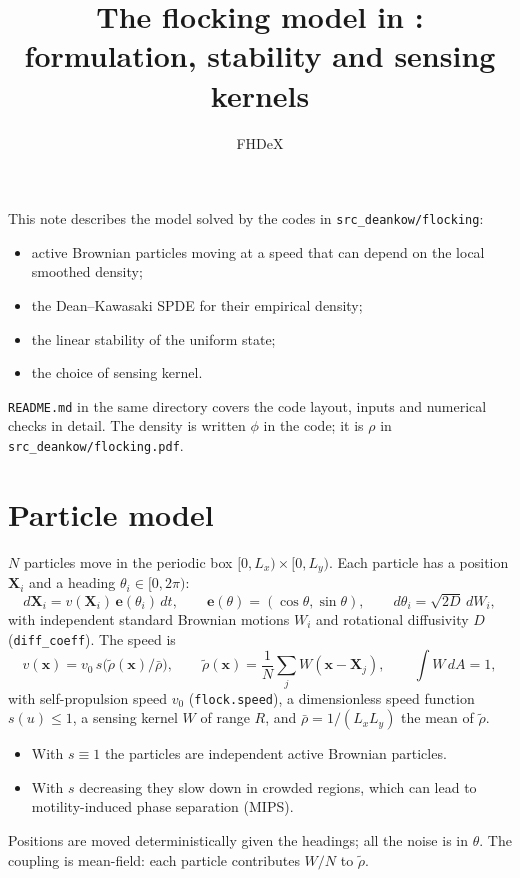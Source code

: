 \documentclass[11pt]{article}
\title{The flocking model in \code{src\_deankow/flocking}:\\
formulation, stability and sensing kernels}
\author{FHDeX}
\date{}
\newcommand{\code}[1]{\texttt{#1}}
\newcommand{\e}{\mathbf{e}}
\newcommand{\rt}{\tilde\rho}
\newcommand{\rb}{\bar\rho}
\begin{document}
\maketitle

\noindent This note describes the model solved by the codes in
\code{src\_deankow/flocking}:
\begin{itemize}[nosep]
  \item active Brownian particles moving at a speed that can depend on the
        local smoothed density;
  \item the Dean--Kawasaki SPDE for their empirical density;
  \item the linear stability of the uniform state;
  \item the choice of sensing kernel.
\end{itemize}
\code{README.md} in the same directory covers the code layout, inputs and
numerical checks in detail. The density is written $\phi$ in the code; it is
$\rho$ in \code{src\_deankow/flocking.pdf}.

\section{Particle model}

$N$ particles move in the periodic box $[0,L_x)\times[0,L_y)$. Each particle
has a position $\mathbf{X}_i$ and a heading $\theta_i\in[0,2\pi)$:
\begin{equation}
  d\mathbf{X}_i = v(\mathbf{X}_i)\,\e(\theta_i)\,dt, \qquad
  \e(\theta) = (\cos\theta, \sin\theta), \qquad
  d\theta_i = \sqrt{2D}\,dW_i ,
\end{equation}
with independent standard Brownian motions $W_i$ and rotational diffusivity
$D$ (\code{diff\_coeff}). The speed is
\begin{equation}
  v(\mathbf{x}) = v_0\, s\bigl(\rt(\mathbf{x})/\rb\bigr), \qquad
  \rt(\mathbf{x}) = \frac{1}{N}\sum_j W(\mathbf{x}-\mathbf{X}_j), \qquad
  \int W\,dA = 1 ,
\end{equation}
with self-propulsion speed $v_0$ (\code{flock.speed}), a dimensionless speed
function $s(u)\le 1$, a sensing kernel $W$ of range $R$, and
$\rb = 1/(L_xL_y)$ the mean of $\rt$.
\begin{itemize}
  \item With $s\equiv 1$ the particles are independent active Brownian
        particles.
  \item With $s$ decreasing they slow down in crowded regions, which can lead
        to motility-induced phase separation (MIPS).
\end{itemize}
Positions are moved deterministically given the headings; all the noise is in
$\theta$. The coupling is mean-field: each particle contributes $W/N$ to
$\rt$.
\end{document}
